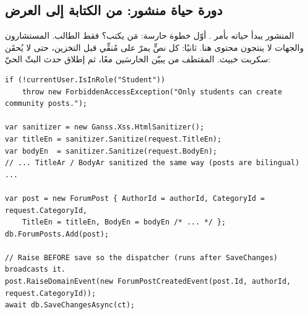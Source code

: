 \begin{center}
\begin{LTR}
\end{LTR}
\end{center}

\subsection{دورة حياة منشور: من الكتابة إلى العرض}

المنشور يبدأ حياته بأمر . أوّل خطوة حارسة: مَن يكتب؟ فقط الطالب.
المستشارون والجهات لا ينتجون محتوى هنا. ثانيًا: كل نصٍّ يمرّ على مُنقِّي  قبل
التخزين، حتى لا يُحقَن سكربت خبيث. المقتطف من  يبيّن الحارسَين
معًا، ثم إطلاق حدث البثّ الحيّ:

\begin{english}
\begin{lstlisting}[language={[Sharp]C}]
if (!currentUser.IsInRole("Student"))
    throw new ForbiddenAccessException("Only students can create community posts.");

var sanitizer = new Ganss.Xss.HtmlSanitizer();
var titleEn = sanitizer.Sanitize(request.TitleEn);
var bodyEn  = sanitizer.Sanitize(request.BodyEn);
// ... TitleAr / BodyAr sanitized the same way (posts are bilingual) ...

var post = new ForumPost { AuthorId = authorId, CategoryId = request.CategoryId,
    TitleEn = titleEn, BodyEn = bodyEn /* ... */ };
db.ForumPosts.Add(post);

// Raise BEFORE save so the dispatcher (runs after SaveChanges) broadcasts it.
post.RaiseDomainEvent(new ForumPostCreatedEvent(post.Id, authorId, request.CategoryId));
await db.SaveChangesAsync(ct);
\end{lstlisting}
\end{english}

